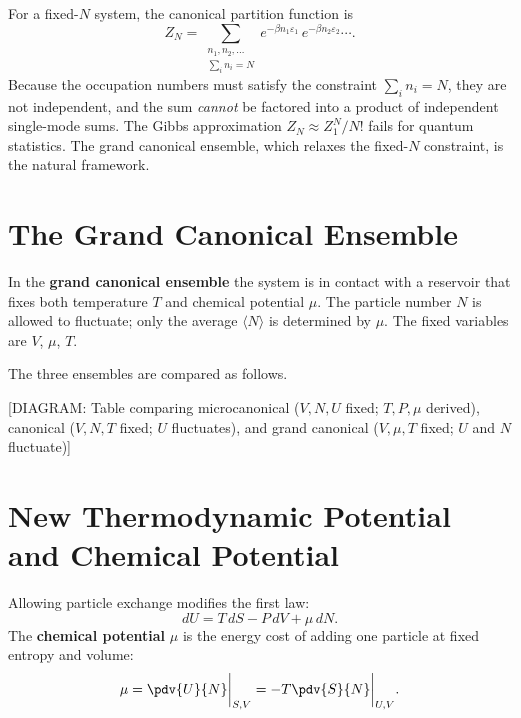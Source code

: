 For a fixed-$N$ system, the canonical partition function is
\begin{equation}
    Z_N = \sum_{\substack{n_1,n_2,\ldots \\ \sum_i n_i = N}}
    e^{-\beta n_1\varepsilon_1}\,e^{-\beta n_2\varepsilon_2}\cdots.
\end{equation}
Because the occupation numbers must satisfy the constraint $\sum_i n_i = N$, they
are not independent, and the sum \emph{cannot} be factored into a product of
independent single-mode sums.  The Gibbs approximation $Z_N \approx Z_1^N/N!$
fails for quantum statistics.  The grand canonical ensemble, which relaxes the
fixed-$N$ constraint, is the natural framework.

\section{The Grand Canonical Ensemble}

\begin{definition}
In the \textbf{grand canonical ensemble} the system is in contact with a reservoir
that fixes both temperature $T$ and chemical potential $\mu$.  The particle number
$N$ is allowed to fluctuate; only the average $\langle N\rangle$ is determined by
$\mu$.  The fixed variables are $V$, $\mu$, $T$.
\end{definition}

The three ensembles are compared as follows.

\begin{center}
[DIAGRAM: Table comparing microcanonical ($V,N,U$ fixed; $T,P,\mu$ derived),
canonical ($V,N,T$ fixed; $U$ fluctuates), and grand canonical ($V,\mu,T$ fixed;
$U$ and $N$ fluctuate)]
\end{center}

\section{New Thermodynamic Potential and Chemical Potential}

Allowing particle exchange modifies the first law:
\begin{equation}
    dU = T\,dS - P\,dV + \mu\,dN.
\end{equation}
The \textbf{chemical potential} $\mu$ is the energy cost of adding one particle
at fixed entropy and volume:
\begin{equation}
    \mu = \pdv{U}{N}\bigg|_{S,V} = -T\pdv{S}{N}\bigg|_{U,V}.
\end{equation}

